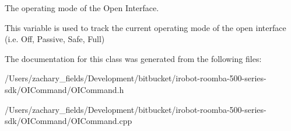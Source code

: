 The operating mode of the Open Interface. 

This variable is used to track the current operating mode of the open interface (i.\+e. Off, Passive, Safe, Full) 

The documentation for this class was generated from the following files\+:\begin{DoxyCompactItemize}
\item 
/\+Users/zachary\+\_\+fields/\+Development/bitbucket/irobot-\/roomba-\/500-\/series-\/sdk/\+O\+I\+Command/O\+I\+Command.\+h\item 
/\+Users/zachary\+\_\+fields/\+Development/bitbucket/irobot-\/roomba-\/500-\/series-\/sdk/\+O\+I\+Command/O\+I\+Command.\+cpp\end{DoxyCompactItemize}
